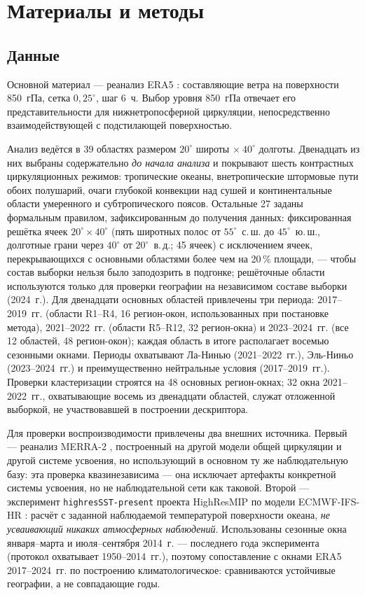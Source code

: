\documentclass[11pt,a4paper]{article}
\begin{document}
\section{Материалы и методы}
\label{sec:data}

\subsection{Данные}

Основной материал --- реанализ ERA5 \cite{Hersbach2020,Soci2024}: составляющие ветра на поверхности 850~гПа, сетка $0{,}25^\circ$, шаг 6~ч. Выбор уровня 850~гПа отвечает его представительности для нижнетропосферной циркуляции, непосредственно взаимодействующей с подстилающей поверхностью.

Анализ ведётся в 39 областях размером $20^\circ$ широты $\times\ 40^\circ$ долготы. Двенадцать из них выбраны содержательно \emph{до начала анализа} и покрывают шесть контрастных циркуляционных режимов: тропические океаны, внетропические штормовые пути обоих полушарий, очаги глубокой конвекции над сушей и континентальные области умеренного и субтропического поясов. Остальные 27 заданы формальным правилом, зафиксированным до получения данных: фиксированная решётка ячеек $20^\circ\times40^\circ$ (пять широтных полос от $55^\circ$~с.\,ш. до $45^\circ$~ю.\,ш., долготные грани через $40^\circ$ от $20^\circ$~в.\,д.; 45 ячеек) с исключением ячеек, перекрывающихся с основными областями более чем на 20\,\% площади, --- чтобы состав выборки нельзя было заподозрить в подгонке; решёточные области используются только для проверки географии на независимом составе выборки (2024~г.). Для двенадцати основных областей привлечены три периода: 2017--2019~гг. (области R1--R4, 16 регион-окон, использованных при постановке метода), 2021--2022~гг. (области R5--R12, 32 регион-окна) и 2023--2024~гг. (все 12 областей, 48 регион-окон); каждая область в итоге располагает восемью сезонными окнами. Периоды охватывают Ла-Нинью (2021--2022~гг.), Эль-Ниньо (2023--2024~гг.) и преимущественно нейтральные условия (2017--2019~гг.). Проверки кластеризации строятся на 48 основных регион-окнах; 32 окна 2021--2022~гг., охватывающие восемь из двенадцати областей, служат отложенной выборкой, не участвовавшей в построении дескриптора.

Для проверки воспроизводимости привлечены два внешних источника. Первый --- реанализ MERRA-2 \cite{Gelaro2017}, построенный на другой модели общей циркуляции и другой системе усвоения, но использующий в основном ту же наблюдательную базу: эта проверка квазинезависима --- она исключает артефакты конкретной системы усвоения, но не наблюдательной сети как таковой. Второй --- эксперимент \texttt{highresSST-present} проекта HighResMIP \cite{Haarsma2016} по модели ECMWF-IFS-HR \cite{Roberts2018}: расчёт с заданной наблюдаемой температурой поверхности океана, \emph{не усваивающий никаких атмосферных наблюдений}. Использованы сезонные окна января--марта и июля--сентября 2014~г. --- последнего года эксперимента (протокол охватывает 1950--2014~гг.), поэтому сопоставление с окнами ERA5 2017--2024~гг. по построению климатологическое: сравниваются устойчивые географии, а не совпадающие годы.
\end{document}
